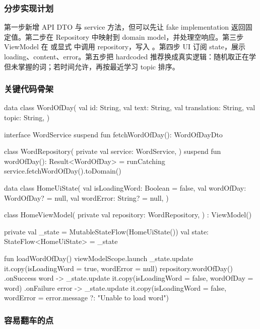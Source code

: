 \subsubsection*{分步实现计划}

第一步新增 API DTO 与 service 方法，但可以先让 fake implementation 返回固定值。第二步在 Repository 中映射到 domain model，并处理空响应。第三步 ViewModel 在  或显式  中调用 repository，写入 。第四步 UI 订阅 state，展示 loading、content、error。第五步把 hardcoded 推荐换成真实逻辑：随机取正在学但未掌握的词；若时间允许，再按最近学习 topic 排序。

\subsubsection*{关键代码骨架}

\begin{kotlin}
data class WordOfDay(
    val id: String,
    val text: String,
    val translation: String,
    val topic: String,
)

interface WordService {
    suspend fun fetchWordOfDay(): WordOfDayDto
}

class WordRepository(
    private val service: WordService,
) {
    suspend fun wordOfDay(): Result<WordOfDay> = runCatching {
        service.fetchWordOfDay().toDomain()
    }
}

data class HomeUiState(
    val isLoadingWord: Boolean = false,
    val wordOfDay: WordOfDay? = null,
    val wordError: String? = null,
)

class HomeViewModel(
    private val repository: WordRepository,
) : ViewModel() {
    private val _state = MutableStateFlow(HomeUiState())
    val state: StateFlow<HomeUiState> = _state

    fun loadWordOfDay() {
        viewModelScope.launch {
            _state.update { it.copy(isLoadingWord = true, wordError = null) }
            repository.wordOfDay()
                .onSuccess { word ->
                    _state.update { it.copy(isLoadingWord = false, wordOfDay = word) }
                }
                .onFailure { error ->
                    _state.update {
                        it.copy(isLoadingWord = false, wordError = error.message ?: "Unable to load word")
                    }
                }
        }
    }
}
\end{kotlin}

\subsubsection*{容易翻车的点}

